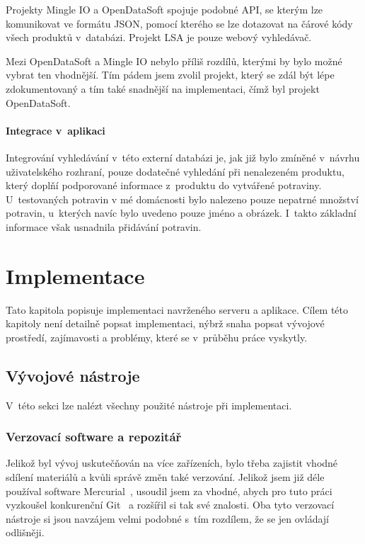 \documentclass[thesis=B,czech]{FITthesis}[2013/10/20]
\begin{document}
Projekty Mingle IO a OpenDataSoft spojuje podobné API, se kterým lze komunikovat ve formátu JSON, pomocí kterého se lze dotazovat na čárové kódy všech produktů v~databázi. Projekt LSA je pouze webový vyhledávač.

Mezi OpenDataSoft a Mingle IO nebylo příliš rozdílů, kterými by bylo možné vybrat ten vhodnější. Tím pádem jsem zvolil projekt, který se zdál být lépe zdokumentovaný a tím také snadnější na implementaci, čímž byl projekt OpenDataSoft.

\subsubsection{Integrace v~aplikaci}

Integrování vyhledávání v~této externí databázi je, jak již bylo zmíněné v~návrhu uživatelského rozhraní, pouze dodatečné vyhledání při nenalezeném produktu, který doplňí podporované informace z~produktu do vytvářené potraviny. U~testovaných potravin v mé domácnosti bylo nalezeno pouze nepatrné množství potravin, u~kterých navíc bylo uvedeno pouze jméno a obrázek. I~takto základní informace však usnadnila přidávání potravin.

\chapter{Implementace}

Tato kapitola popisuje implementaci navrženého serveru a aplikace. Cílem této kapitoly není detailně popsat implementaci, nýbrž snaha popsat vývojové prostředí, zajímavosti a problémy, které se v~průběhu práce vyskytly.

\section{Vývojové nástroje}
V~této sekci lze nalézt všechny použité nástroje při implementaci.

\subsection{Verzovací software a repozitář}

Jelikož byl vývoj uskutečňován na více zařízeních, bylo třeba zajistit vhodné sdílení materiálů a kvůli správě změn také verzování. Jelikož jsem již déle používal software Mercurial~\cite{hg}, usoudil jsem za vhodné, abych pro tuto práci vyzkoušel konkurenční Git~\cite{git} a rozšířil si tak své znalosti. Oba tyto verzovací nástroje si jsou navzájem velmi podobné s~tím rozdílem, že se jen ovládají odlišněji.
\end{document}
